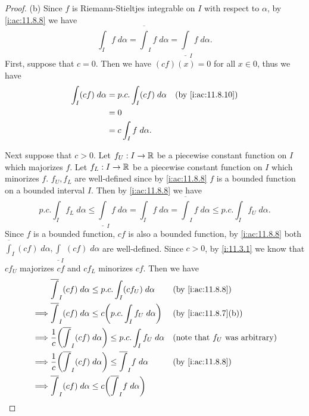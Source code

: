 \begin{proof}{(b)}
  Since \(f\) is Riemann-Stieltjes integrable on \(I\) with respect to \(\alpha\), by \cref{i:ac:11.8.8} we have
  \[
    \int_I f \; d \alpha = \overline{\int}_I f \; d \alpha = \underline{\int}_I f \; d \alpha.
  \]
  First, suppose that \(c = 0\).
  Then we have \((cf)(x) = 0\) for all \(x \in 0\), thus we have
  \begin{align*}
    \int_I (cf) \; d \alpha & = p.c. \int_I (cf) \; d \alpha &  & \by{i:ac:11.8.10} \\
                            & = 0                                                   \\
                            & = c \int_I f \; d \alpha.
  \end{align*}

  Next suppose that \(c > 0\).
  Let \(f_U : I \to \mathbb{R}\) be a piecewise constant function on \(I\) which majorizes \(f\).
  Let \(f_L : I \to \mathbb{R}\) be a piecewise constant function on \(I\) which minorizes \(f\).
  \(f_U, f_L\) are well-defined since by \cref{i:ac:11.8.8} \(f\) is a bounded function on a bounded interval \(I\).
  Then by \cref{i:ac:11.8.8} we have
  \[
    p.c. \int_I f_L \; d \alpha \leq \underline{\int}_I f \; d \alpha = \int_I f \; d \alpha = \overline{\int}_I f \; d \alpha \leq p.c. \int_I f_U \; d \alpha.
  \]
  Since \(f\) is a bounded function, \(cf\) is also a bounded function, by \cref{i:ac:11.8.8} both \(\overline{\int}_I (cf) \; d \alpha, \underline{\int}_I (cf) \; d \alpha\) are well-defined.
  Since \(c > 0\), by \cref{i:11.3.1} we know that \(c f_U\) majorizes \(c f\) and \(c f_L\) minorizes \(c f\).
  Then we have
  \begin{align*}
             & \overline{\int}_I (cf) \; d \alpha \leq p.c. \int_I (c f_U) \; d \alpha                          &  & \by{i:ac:11.8.8}                         \\
    \implies & \overline{\int}_I (cf) \; d \alpha \leq c \bigg(p.c. \int_I f_U \; d \alpha\bigg)                &  & \by{i:ac:11.8.7}[b]                      \\
    \implies & \dfrac{1}{c} \bigg(\overline{\int}_I (cf) \; d \alpha\bigg) \leq p.c. \int_I f_U \; d \alpha     &  & \text{(note that \(f_U\) was arbitrary)} \\
    \implies & \dfrac{1}{c} \bigg(\overline{\int}_I (cf) \; d \alpha\bigg) \leq \overline{\int}_I f \; d \alpha &  & \by{i:ac:11.8.8}                         \\
    \implies & \overline{\int}_I (cf) \; d \alpha \leq c\bigg(\overline{\int}_I f \; d \alpha\bigg)                                                           \\

\end{align*}
\end{proof}
